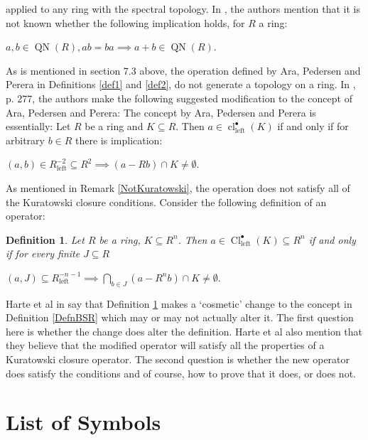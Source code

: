 \documentclass[12pt, oneside]{book}
\newtheorem{definition}[theorem]{Definition}
\def\QN{\operatorname{QN}}
\def\cl{\operatorname{cl}}
\def\Cl{\operatorname{Cl}}
\def\Left{\operatorname{left}}
\begin{document}
applied to any ring with the spectral topology. In \cite{CH3}, the authors mention that it is not known whether the following implication holds, for $R$ a ring:
\begin{center}
$a, b \in \QN(R), ab = ba \implies a + b \in \QN(R).$
\end{center}
\vskip 0.3cm
As is mentioned in section 7.3 above, the operation defined by Ara, Pedersen and Perera in 
Definitions \ref{def1} and \ref{def2}, do not generate a topology on a ring. In \cite{CH3}, p. 277,
the authors make the following suggested modification to the concept of Ara, Pedersen and Perera:
\vskip 0.3cm
\noindent The concept by Ara, Pedersen and Perera is essentially:
\vskip 0.3cm
\noindent Let $R$ be a ring and $K \subseteq R$. Then $a \in \cl^{\bullet}_{\Left}(K)$ if and only if 
for arbitrary $b \in R$ 
there is implication:
\begin{center}
$(a, b) \in R^{-2}_{\Left} \subseteq R^2 \implies (a - Rb) \cap K \neq \emptyset$.
\end{center} 
\noindent As mentioned in Remark \ref{NotKuratowski}, the operation does not satisfy all of the
Kuratowski closure conditions. Consider the following definition of an operator:
\newpage
\begin{definition} \label{NewOperator}
\normalfont
\noindent Let $R$ be a ring, $K \subseteq R^n$. Then $a \in \Cl^{\bullet}_{\Left}(K) \subseteq R^n$ 
if and only if
for every finite $J \subseteq R$
\begin{center}
 $(a, J) \subseteq R^{-n-1}_{\Left} \implies \displaystyle \bigcap_{b \in J} (a - R^nb) \cap K \neq \emptyset.$
\end{center}
\end{definition}
\noindent Harte et al in \cite{CH3} say that Definition \ref{NewOperator} makes a `cosmetic' change to the concept in Definition \ref{DefnBSR} which may or may not actually alter it. The first question here 
is whether the change does alter the definition. Harte et al also mention that they believe that 
the modified operator will satisfy all the properties of a Kuratowski closure operator. 
The second question is whether the new operator does satisfy the conditions and of course, how to prove that it does, or does not.

\vskip 2cm
\begin{center}
\maltese
\end{center}

\chapter*{List of Symbols}
%
\end{document}
